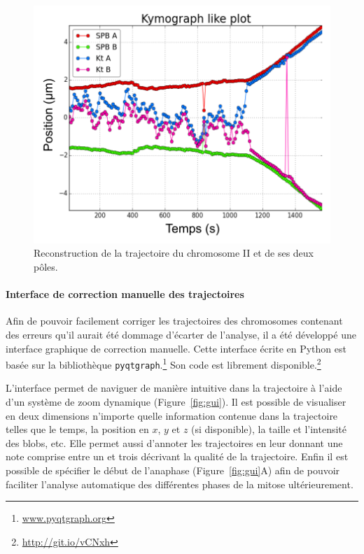 \documentclass[12pt,a4paper,twoside,openright]{book}
\let\oldparagraph\paragraph
\renewcommand{\paragraph}[1]{\oldparagraph{#1}\mbox{}}
\begin{document}
\begin{figure}[htbp]
\centering
\includegraphics{figures/results/imaging/cen2.png}
\caption[Reconstruction de la trajectoire du chromosome II et de ces deux pôles.]{\label{fig:cen2}Reconstruction
de la trajectoire du chromosome II et de ses deux pôles.}
\end{figure}

\paragraph{Interface de correction manuelle des
trajectoires}\label{interface-de-correction-manuelle-des-trajectoires}

Afin de pouvoir facilement corriger les trajectoires des chromosomes
contenant des erreurs qu'il aurait été dommage d'écarter de l'analyse,
il a été développé une interface graphique de correction manuelle. Cette
interface écrite en Python est basée sur la bibliothèque
\texttt{pyqtgraph}.\footnote{\url{www.pyqtgraph.org}} Son code est
librement disponible.\footnote{\url{http://git.io/vCNxh}}

L'interface permet de naviguer de manière intuitive dans la trajectoire
à l'aide d'un système de zoom dynamique (Figure~\ref{fig:gui}). Il est
possible de visualiser en deux dimensions n'importe quelle information
contenue dans la trajectoire telles que le temps, la position en \(x\),
\(y\) et \(z\) (si disponible), la taille et l'intensité des blobs, etc.
Elle permet aussi d'annoter les trajectoires en leur donnant une note
comprise entre un et trois décrivant la qualité de la trajectoire. Enfin
il est possible de spécifier le début de l'anaphase
(Figure~\ref{fig:gui}A) afin de pouvoir faciliter l'analyse automatique
des différentes phases de la mitose ultérieurement.
\end{document}
